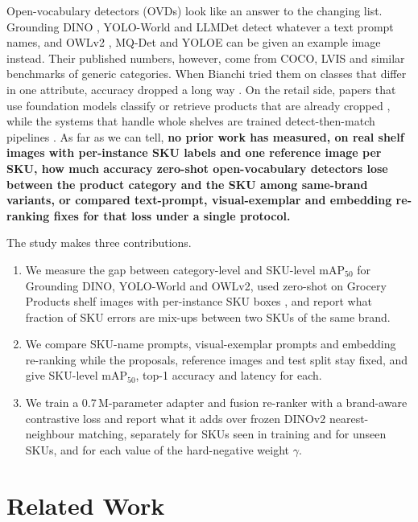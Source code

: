 \documentclass[10pt,twocolumn,letterpaper]{article}
\begin{document}
Open-vocabulary detectors (OVDs) look like an answer to the changing list. Grounding DINO \cite{liu2024groundingdino}, YOLO-World \cite{cheng2024yoloworld} and LLMDet \cite{fu2025llmdet} detect whatever a text prompt names, and OWLv2 \cite{minderer2023owlv2}, MQ-Det \cite{xu2023mqdet} and YOLOE \cite{wang2025yoloe} can be given an example image instead. Their published numbers, however, come from COCO, LVIS and similar benchmarks of generic categories. When Bianchi \etal tried them on classes that differ in one attribute, accuracy dropped a long way \cite{bianchi2024devil}. On the retail side, papers that use foundation models classify or retrieve products that are already cropped \cite{tur2024mimex,maminta2026groceryretrieval}, while the systems that handle whole shelves are trained detect-then-match pipelines \cite{tonioni2018pipeline,osokin2020os2d,budimir2025contextaware}. As far as we can tell, \textbf{no prior work has measured, on real shelf images with per-instance SKU labels and one reference image per SKU, how much accuracy zero-shot open-vocabulary detectors lose between the product category and the SKU among same-brand variants, or compared text-prompt, visual-exemplar and embedding re-ranking fixes for that loss under a single protocol.}

The study makes three contributions.
\begin{enumerate}
  \item We measure the gap between category-level and SKU-level mAP$_{50}$ for Grounding DINO, YOLO-World and OWLv2, used zero-shot on Grocery Products shelf images with per-instance SKU boxes \cite{george2014grocery,osokin2020os2d}, and report what fraction of SKU errors are mix-ups between two SKUs of the same brand.
  \item We compare SKU-name prompts, visual-exemplar prompts and embedding re-ranking while the proposals, reference images and test split stay fixed, and give SKU-level mAP$_{50}$, top-1 accuracy and latency for each.
  \item We train a 0.7\,M-parameter adapter and fusion re-ranker with a brand-aware contrastive loss and report what it adds over frozen DINOv2 nearest-neighbour matching, separately for SKUs seen in training and for unseen SKUs, and for each value of the hard-negative weight $\gamma$.
\end{enumerate}

\section{Related Work}
\label{sec:related}
\end{document}
